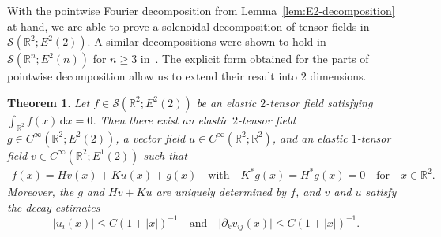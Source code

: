 \documentclass[11pt]{article}
\newcommand{\abs}[1]{\lvert #1 \rvert}
\newcommand{\Rb}{\mathbb{R}}
\renewcommand{\d}{\mathrm{d}}
\newtheorem{theorem}{Theorem}[]
\begin{document}
With the pointwise Fourier decomposition from Lemma~\ref{lem:E2-decomposition} at hand, we are able to prove a solenoidal decomposition of tensor fields in $\mathcal{S}(\mathbb{R}^2;E^2(2))$. A similar decompositions were shown to hold in $\mathcal{S}(\mathbb{R}^n;E^2(n))$ for $n \geq 3$ in~\cite{ilmavirta2025elasticraytransform}. The explicit form obtained for the parts of pointwise decomposition allow us to extend their result into $2$ dimensions.

\begin{theorem}
\label{th:decomposition_elastic}
Let $ f \in \mathcal{S}(\mathbb{R}^2;E^2(2))$ be an elastic $2$-tensor field satisfying $\int_{\Rb^2} f(x)\,\d x = 0$. Then there exist an elastic $2$-tensor field $g \in C^\infty(\mathbb{R}^2;E^2(2))$, a vector field $u \in C^\infty(\mathbb{R}^2;\mathbb{R}^2)$, and an elastic $1$-tensor field $v \in C^\infty(\mathbb{R}^2;E^1(2))$ such that   \begin{align}
\label{new_decomp_of_f_no_restriction_elastic}
f(x) = H v(x) + K u(x) + g(x)
\quad\text{with}\quad
K^{*} g(x) = H^{*} g(x) = 0 
\quad\text{for}\quad
x \in \Rb^2.
\end{align}	
Moreover, the $g$ and $Hv + Ku$ are uniquely determined by $f$, and $v$ and $u$ satisfy the decay estimates
\begin{equation}
\label{eqn:decay-elastic}
\abs{u_i(x)}
\leq
C(1+\abs{x})^{-1}
\quad\text{and}\quad
\abs{\partial_kv_{ij}(x)}
\leq
C(1+\abs{x})^{-1}.
\end{equation}
\end{theorem}
\end{document}
